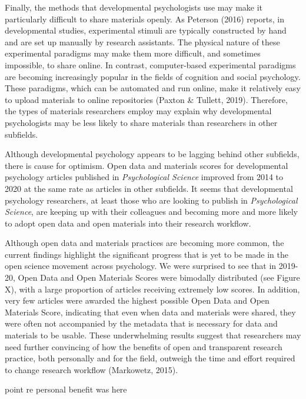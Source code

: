 \documentclass[
  english,
  man,floatsintext]{apa6}
\begin{document}
Finally, the methods that developmental psychologists use may make it particularly difficult to share materials openly. As Peterson (2016) reports, in developmental studies, experimental stimuli are typically constructed by hand and are set up manually by research assistants. The physical nature of these experimental paradigms may make them more difficult, and sometimes impossible, to share online. In contrast, computer-based experimental paradigms are becoming increasingly popular in the fields of cognition and social psychology. These paradigms, which can be automated and run online, make it relatively easy to upload materials to online repositories (Paxton \& Tullett, 2019). Therefore, the types of materials researchers employ may explain why developmental psychologists may be less likely to share materials than researchers in other subfields.

Although developmental psychology appears to be lagging behind other subfields, there is cause for optimism. Open data and materials scores for developmental psychology articles published in \emph{Psychological Science} improved from 2014 to 2020 at the same rate as articles in other subfields. It seems that developmental psychology researchers, at least those who are looking to publish in \emph{Psychological Science}, are keeping up with their colleagues and becoming more and more likely to adopt open data and open materials into their research workflow.

Although open data and materials practices are becoming more common, the current findings highlight the significant progress that is yet to be made in the open science movement across psychology. We were surprised to see that in 2019-20, Open Data and Open Materials Scores were bimodally distributed (see Figure X), with a large proportion of articles receiving extremely low scores. In addition, very few articles were awarded the highest possible Open Data and Open Materials Score, indicating that even when data and materials were shared, they were often not accompanied by the metadata that is necessary for data and materials to be usable. These underwhelming results suggest that researchers may need further convincing of how the benefits of open and transparent research practice, both personally and for the field, outweigh the time and effort required to change research workflow (Markowetz, 2015).

point re personal benefit was here
\end{document}
